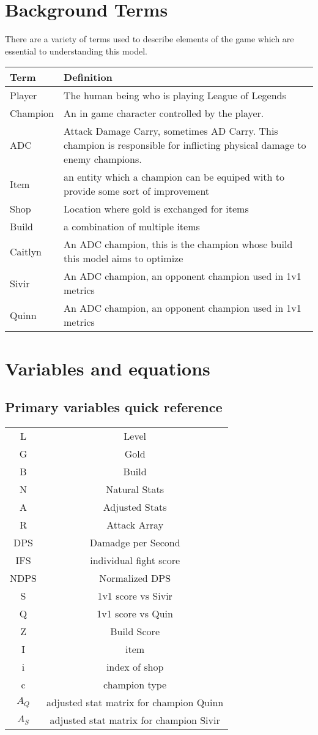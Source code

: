 \documentclass{article}
\begin{document}
\section{Background Terms}
There are a variety of terms used to describe elements of the game which are essential to understanding this model. \\
\begin{tabular}{| l| L| }
   Term & Definition\\ \hline
   Player &  The human being who is playing League of Legends \\ \hline
   Champion & An in game character controlled by the player.\\ \hline
   ADC & Attack Damage Carry, sometimes AD Carry.  This champion is responsible for inflicting physical damage to enemy champions. \\ \hline
   Item & an entity which a champion can be equiped with to provide some sort of improvement \\ \hline
   Shop & Location where gold is exchanged for items\\ \hline
   Build & a combination of multiple items \\ \hline
   Caitlyn & An ADC champion, this is the champion whose build this model aims to optimize\\ \hline
   Sivir &  An ADC champion, an opponent champion used in 1v1 metrics\\
   Quinn  & An ADC champion, an opponent champion used in 1v1 metrics\\
   
\end{tabular}
\section{Variables and equations}
\subsection{Primary variables quick reference}
\begin{tabular}{|c|c|}
L & Level \\
G & Gold \\
B & Build \\
N & Natural Stats \\
A & Adjusted Stats\\
R & Attack Array\\
DPS &  Damadge per Second \\
IFS & individual fight score\\
NDPS & Normalized DPS\\
S & 1v1 score vs Sivir\\
Q & 1v1 score vs Quin\\
Z & Build Score\\
I &item\\
i  & index of shop \\
c & champion type\\
$A_Q$ &  adjusted stat matrix for champion Quinn\\
$A_S$ & adjusted stat matrix for champion Sivir\\
\end{tabular}
\end{document}
